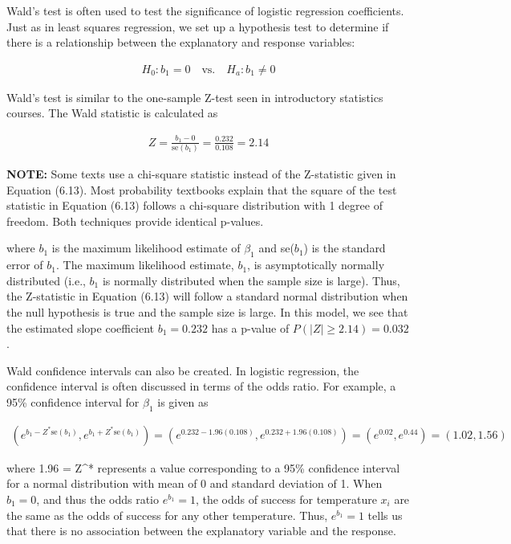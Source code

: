 \documentclass[
]{report}
\begin{document}
Wald's test is often used to test the significance of logistic regression coefficients. Just as in least squares regression, we set up a hypothesis test to determine if there is a relationship between the explanatory and response variables:

\begin{align}
H_0: b_1 = 0 \quad \text{vs.}\quad H_a: b_1 \neq 0
\end{align}

Wald's test is similar to the one-sample Z-test seen in introductory statistics courses. The Wald statistic is calculated as

\begin{align}
Z = \frac{b_1 - 0}{\text{se}(b_1)} = \frac{0.232}{0.108} = 2.14 \tag{6.13}
\end{align}

\large

\textbf{NOTE:}
Some texts use a chi-square statistic instead of the Z-statistic given in Equation (6.13). Most probability textbooks explain that the square of the test statistic in Equation (6.13) follows a chi-square distribution with 1 degree of freedom. Both techniques provide identical p-values.
\normalsize

where \(b_1\) is the maximum likelihood estimate of \(\beta_1\) and se(\(b_1\)) is the standard error of \(b_1\). The maximum likelihood estimate, \(b_1\), is asymptotically normally distributed (i.e., \(b_1\) is normally distributed when the sample size is large). Thus, the Z-statistic in Equation (6.13) will follow a standard normal distribution when the null hypothesis is true and the sample size is large. In this model, we see that the estimated slope coefficient \(b_1 = 0.232\) has a p-value of \(P(|Z| \geq 2.14) = 0.032\).

Wald confidence intervals can also be created. In logistic regression, the confidence interval is often discussed in terms of the odds ratio. For example, a 95\% confidence interval for \(\beta_1\) is given as

\begin{align}
(e^{b_1 - Z^* \text{se}(b_1)}, e^{b_1 + Z^* \text{se}(b_1)}) = (e^{0.232 - 1.96(0.108)}, e^{0.232 + 1.96(0.108)}) = (e^{0.02}, e^{0.44}) = (1.02, 1.56) \tag{6.14}
\end{align}

where 1.96 = Z\^{}* represents a value corresponding to a 95\% confidence interval for a normal distribution with mean of 0 and standard deviation of 1. When \(b_1 = 0\), and thus the odds ratio \(e^{b_1} = 1\), the odds of success for temperature \(x_i\) are the same as the odds of success for any other temperature. Thus, \(e^{b_1} = 1\) tells us that there is no association between the explanatory variable and the response.
\end{document}

